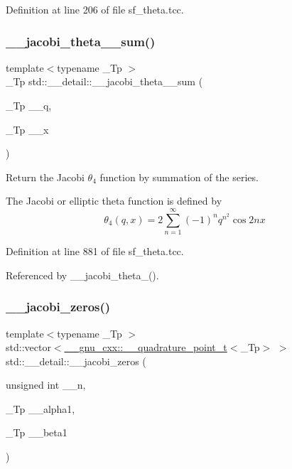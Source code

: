 Definition at line 206 of file sf\+\_\+theta.\+tcc.

\mbox{\label{namespacestd_1_1____detail_a6f1dd356335537ad693089ccb8d8c755}} 
\subsubsection{\texorpdfstring{\+\_\+\+\_\+jacobi\+\_\+theta\+\_\+\_\+sum()}{\_\_jacobi\_theta\_4\_sum()}}
{\footnotesize\ttfamily template$<$typename \+\_\+\+Tp $>$ \\
\+\_\+\+Tp std\+::\+\_\+\+\_\+detail\+::\+\_\+\+\_\+jacobi\+\_\+theta\+\_\+\_\+sum (\begin{DoxyParamCaption}\item[{\+\_\+\+Tp}]{\+\_\+\+\_\+q,  }\item[{\+\_\+\+Tp}]{\+\_\+\+\_\+x }\end{DoxyParamCaption})}

Return the Jacobi $ \theta_4 $ function by summation of the series.

The Jacobi or elliptic theta function is defined by \[ \theta_4(q,x) = 2\sum_{n=1}^{\infty}(-1)^n q^{n^2}\cos{2nx} \] 

Definition at line 881 of file sf\+\_\+theta.\+tcc.



Referenced by \+\_\+\+\_\+jacobi\+\_\+theta\+\_().

\mbox{\label{namespacestd_1_1____detail_a53800598007d45e144cf147c2408a3d6}} 
\subsubsection{\texorpdfstring{\+\_\+\+\_\+jacobi\+\_\+zeros()}{\_\_jacobi\_zeros()}}
{\footnotesize\ttfamily template$<$typename \+\_\+\+Tp $>$ \\
std\+::vector$<$\hyperlink{struct____gnu__cxx_1_1____quadrature__point__t}{\+\_\+\+\_\+gnu\+\_\+cxx\+::\+\_\+\+\_\+quadrature\+\_\+point\+\_\+t}$<$\+\_\+\+Tp$>$ $>$ std\+::\+\_\+\+\_\+detail\+::\+\_\+\+\_\+jacobi\+\_\+zeros (\begin{DoxyParamCaption}\item[{unsigned int}]{\+\_\+\+\_\+n,  }\item[{\+\_\+\+Tp}]{\+\_\+\+\_\+alpha1,  }\item[{\+\_\+\+Tp}]{\+\_\+\+\_\+beta1 }\end{DoxyParamCaption})}


